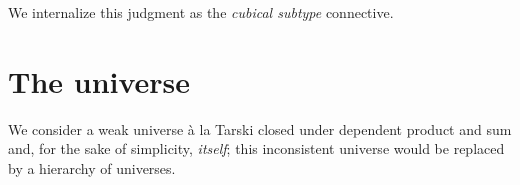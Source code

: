 \documentclass[draft]{amsart}
\begin{document}
\begin{mathparpagebreakable}
\end{mathparpagebreakable}

We internalize this judgment as the \emph{cubical subtype} connective.


\section{The universe}

We consider a weak universe \`a la Tarski closed under dependent product and sum
and, for the sake of simplicity, \emph{itself}; this inconsistent universe would
be replaced by a hierarchy of universes.
\end{document}
